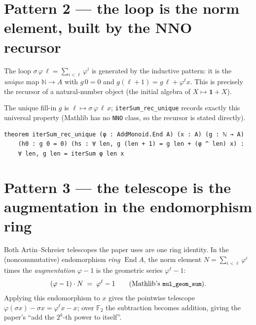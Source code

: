 \documentclass[11pt]{article}
\newcommand{\lc}[1]{\texttt{\small #1}}
\newcommand{\Nn}{\mathbb{N}}
\newcommand{\End}{\operatorname{End}}
\begin{document}
\section{Pattern 2 --- the loop is the norm element, built by the NNO recursor}

The loop $\sigma\,\varphi\,\ell = \sum_{i<\ell}\varphi^{i}$ is generated by the
inductive pattern: it is the \emph{unique} map $\Nn\to A$ with $g\,0=0$ and
$g(\ell+1)=g\,\ell+\varphi^{\ell}x$. This is precisely the recursor of a
natural-number object (the initial algebra of $X\mapsto \mathbf 1+X$).

\begin{center}
\end{center}

The unique fill-in $g$ is $\ell\mapsto\sigma\,\varphi\,\ell\,x$; \lc{iterSum\_rec\_unique}
records exactly this universal property (Mathlib has no \lc{NNO} class, so the
recursor is stated directly).

\begin{lstlisting}
theorem iterSum_rec_unique (φ : AddMonoid.End A) (x : A) (g : ℕ → A)
    (h0 : g 0 = 0) (hs : ∀ len, g (len + 1) = g len + (φ ^ len) x) :
    ∀ len, g len = iterSum φ len x
\end{lstlisting}

\section{Pattern 3 --- the telescope is the augmentation in the endomorphism ring}

Both Artin--Schreier telescopes the paper uses are one ring identity. In the
(noncommutative) endomorphism \emph{ring} $\End A$, the norm element
$N=\sum_{i<\ell}\varphi^{i}$ times the \emph{augmentation} $\varphi-1$ is the
geometric series $\varphi^{\ell}-1$:
\[
  (\varphi-1)\cdot N \;=\; \varphi^{\ell}-1
  \qquad(\text{Mathlib's }\lc{mul\_geom\_sum}).
\]
Applying this endomorphism to $x$ gives the pointwise telescope
$\varphi(\sigma x)-\sigma x=\varphi^{\ell}x-x$; over $\mathbb{F}_2$ the
subtraction becomes addition, giving the paper's ``add the $2^{k}$-th power to
itself''.
\end{document}
